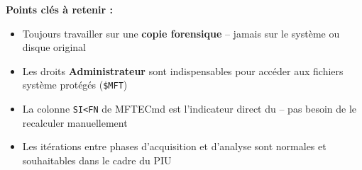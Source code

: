 \documentclass[12pt, a4paper]{report}
\begin{document}
	\vspace{0.35cm}
	
	\begin{boxobjectifs}
		\textbf{Points clés à retenir :}
		\begin{itemize}
			\item Toujours travailler sur une \textbf{copie forensique} --
			jamais sur le système ou disque original
			\item Les droits \textbf{Administrateur} sont indispensables
			pour accéder aux fichiers système protégés (\texttt{\$MFT})
			\item La colonne \texttt{SI<FN} de MFTECmd est l'indicateur
			direct du  -- pas besoin de le
			recalculer manuellement
			\item Les itérations entre phases d'acquisition et d'analyse
			sont normales et souhaitables dans le cadre du PIU
		\end{itemize}
	\end{boxobjectifs}
	
\end{document}
